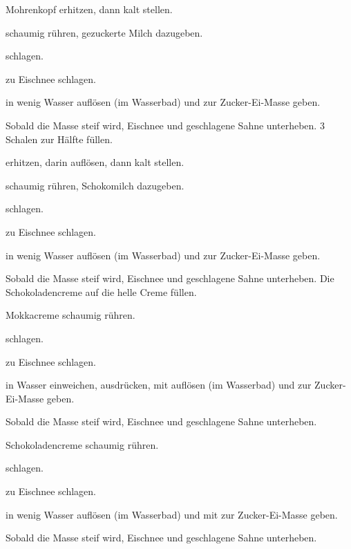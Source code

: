 \begin{recipe}{Mohrenkopf}
  erhitzen, dann kalt stellen.

  schaumig rühren, gezuckerte Milch dazugeben.

  schlagen.
  
  zu Eischnee schlagen.

  in wenig Wasser  auflösen (im Wasserbad) und zur Zucker-Ei-Masse
  geben.

  Sobald die Masse steif wird, Eischnee und geschlagene Sahne
  unterheben. 3 Schalen zur Hälfte füllen.

  erhitzen,
  darin auflösen, dann kalt stellen.

  schaumig rühren, Schokomilch dazugeben.

  schlagen.
  
  zu Eischnee schlagen.

  in wenig Wasser  auflösen (im Wasserbad) und zur Zucker-Ei-Masse
  geben.

  Sobald die Masse steif wird, Eischnee und geschlagene Sahne
  unterheben. Die Schokoladencreme auf die helle Creme füllen.
\end{recipe}



\begin{recipe}{Mokkacreme}
  schaumig rühren.

  schlagen.
  
  zu Eischnee schlagen.

  in Wasser einweichen, ausdrücken, mit
  auflösen (im Wasserbad) und zur Zucker-Ei-Masse geben.

  Sobald die Masse steif wird, Eischnee und geschlagene Sahne
  unterheben.
\end{recipe}



\begin{recipe}{Schokoladencreme}
  schaumig rühren.

  schlagen.
  
  zu Eischnee schlagen.

  in wenig Wasser  auflösen (im Wasserbad) und mit
  zur Zucker-Ei-Masse geben.

  Sobald die Masse steif wird, Eischnee und geschlagene Sahne
  unterheben.
\end{recipe}



